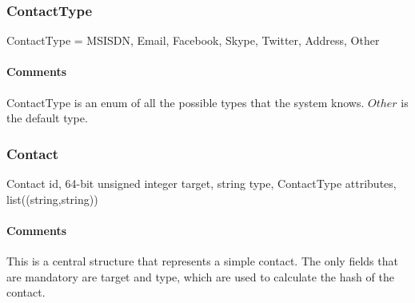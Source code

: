 \documentclass[a4paper,10pt,draft]{article}
\begin{document}
\subsubsection{ContactType}
\begin{verbbox}
ContactType = { MSISDN, Email, Facebook, Skype, Twitter, Address,
                Other }
\end{verbbox}
\begin{center}
\theverbbox
\end{center}

\begin{inparaitem}[ ]
 \item \infrastructure
\end{inparaitem}

\paragraph*{Comments}
ContactType is an enum of all the possible types that the system knows. $Other$ is the default type.

\subsubsection{Contact}
\label{sec:structure:client:contact}

\begin{verbbox}
Contact
{
  id, 64-bit unsigned integer
  target, string
  type, ContactType
  attributes, list((string,string))
}
\end{verbbox}
\begin{center}
\theverbbox
\end{center}

\begin{inparaitem}[ ]
 \item \infrastructure
\end{inparaitem}

\paragraph*{Comments}
This is a central structure that represents a simple contact. The only fields that are mandatory are target and type, which are used to calculate the hash of the contact.
\end{document}
